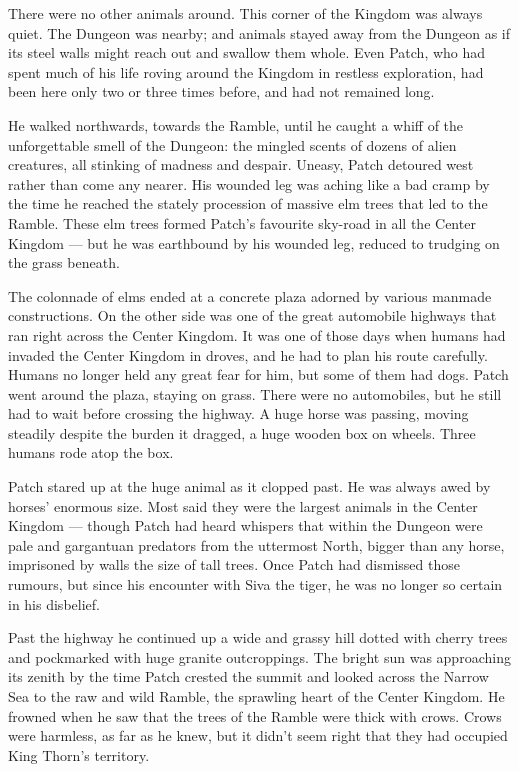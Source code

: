 \documentclass[ebook,oneside,openany,12pt]{memoir}
\begin{document}
There were no other animals around. This corner of the Kingdom was
always quiet. The Dungeon was nearby; and animals stayed away from the
Dungeon as if its steel walls might reach out and swallow them
whole. Even Patch, who had spent much of his life roving around the
Kingdom in restless exploration, had been here only two or three times
before, and had not remained long.

He walked northwards, towards the Ramble, until he caught a whiff of
the unforgettable smell of the Dungeon: the mingled scents of dozens
of alien creatures, all stinking of madness and despair. Uneasy, Patch
detoured west rather than come any nearer. His wounded leg was aching
like a bad cramp by the time he reached the stately procession of
massive elm trees that led to the Ramble. These elm trees formed
Patch’s favourite sky-road in all the Center Kingdom — but he was
earthbound by his wounded leg, reduced to trudging on the grass
beneath.

The colonnade of elms ended at a concrete plaza adorned by various
manmade constructions. On the other side was one of the great
automobile highways that ran right across the Center Kingdom. It was
one of those days when humans had invaded the Center Kingdom in
droves, and he had to plan his route carefully. Humans no longer held
any great fear for him, but some of them had dogs. Patch went around
the plaza, staying on grass. There were no automobiles, but he still
had to wait before crossing the highway. A huge horse was passing,
moving steadily despite the burden it dragged, a huge wooden box on
wheels. Three humans rode atop the box.

Patch stared up at the huge animal as it clopped past. He was always
awed by horses’ enormous size. Most said they were the largest animals
in the Center Kingdom — though Patch had heard whispers that within
the Dungeon were pale and gargantuan predators from the uttermost
North, bigger than any horse, imprisoned by walls the size of tall
trees. Once Patch had dismissed those rumours, but since his encounter
with Siva the tiger, he was no longer so certain in his disbelief.

Past the highway he continued up a wide and grassy hill dotted with
cherry trees and pockmarked with huge granite outcroppings. The bright
sun was approaching its zenith by the time Patch crested the summit
and looked across the Narrow Sea to the raw and wild Ramble, the
sprawling heart of the Center Kingdom. He frowned when he saw that the
trees of the Ramble were thick with crows. Crows were harmless, as far
as he knew, but it didn’t seem right that they had occupied King
Thorn’s territory.
\end{document}
